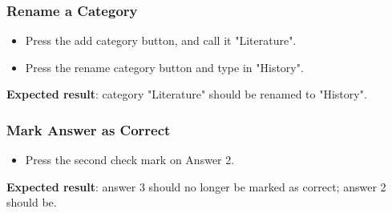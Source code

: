 \subsubsection{Rename a Category}
\begin{itemize}
\item Press the add category button, and call it "Literature".
\item Press the rename category button and type in "History".
\end{itemize}
\textbf{Expected result}: category "Literature" should be renamed to "History".

\subsubsection{Mark Answer as Correct}
\begin{itemize}
\item Press the second check mark on Answer 2.
\end{itemize}
\textbf{Expected result}: answer 3 should no longer be marked as correct; answer 2 should be.
